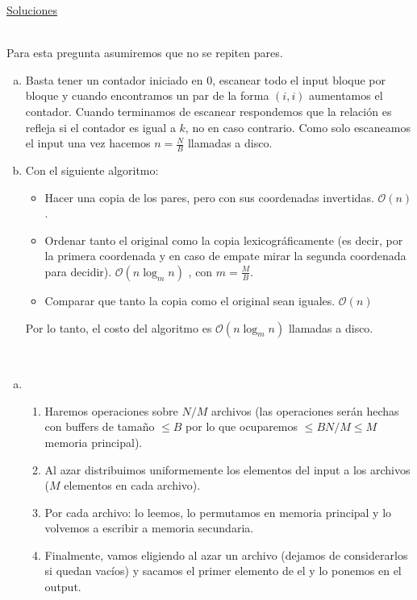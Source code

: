 \documentclass[dcc,uchile]{fcfmcourse}
\theoremstyle{plain}
\theoremstyle{definition}
\begin{document}
\newpage
\begin{center}
{\huge \underline{Soluciones}}
\end{center}
\begin{problems}
\\
Para esta pregunta asumiremos que no se repiten pares.
\begin{enumerate}[a)]
\item Basta tener un contador iniciado en $0$, escanear todo el input bloque por bloque y cuando encontramos un par de la forma $(i,i)$ aumentamos el contador. Cuando terminamos de escanear respondemos que la relación es refleja si el contador es igual a $k$, no en caso contrario. Como solo escaneamos el input una vez hacemos $n=\frac{N}{B}$ llamadas a disco. \flash
\item Con el siguiente algoritmo:
\begin{itemize}
    \item Hacer una copia de los pares, pero con sus coordenadas invertidas. $\mathcal{O}(n)$.
    \item Ordenar tanto el original como la copia lexicográficamente (es decir, por la primera coordenada y en caso de empate mirar la segunda coordenada para decidir). $\mathcal{O}(n\log_{m}n)$ , con $m = \frac{M}{B}$.
    \item Comparar que tanto la copia como el original sean iguales. $\mathcal{O}(n)$
\end{itemize}
Por lo tanto, el costo del algoritmo es $\mathcal{O}(n\log_{m}n)$ llamadas a disco.
\end{enumerate}
\\
\begin{enumerate}[a)]
\item
\begin{enumerate}[1.]
    \item Haremos operaciones sobre $N/M$ archivos (las operaciones serán hechas con buffers de tamaño $\le B$ por lo que ocuparemos $\le BN/M \le M$ memoria principal).
    \item Al azar distribuimos uniformemente los elementos del input a los archivos ($M$ elementos en cada archivo).
    \item Por cada archivo: lo leemos, lo permutamos en memoria principal y lo volvemos a escribir a memoria secundaria.
    \item Finalmente, vamos eligiendo al azar un archivo (dejamos de considerarlos si quedan vacíos) y sacamos el primer elemento de el y lo ponemos en el output.

\end{enumerate}
\end{enumerate}
\end{problems}
\end{document}
